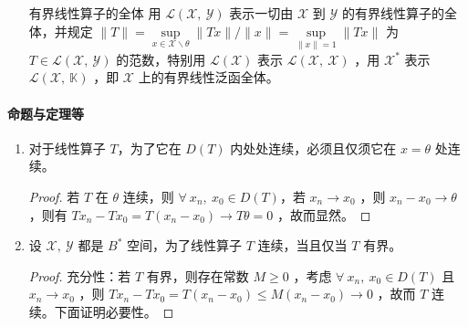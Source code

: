 \begin{enumerate}[leftmargin=2cm, label=\arabic*]
		\item[有界线性算子的全体]用 $\mathscr{L}(\mathscr{X},\ \mathscr{Y})$ 表示一切由 $\mathscr{X}$ 到 $\mathscr{Y}$ 的有界线性算子的全体，并规定 $\|T\| = \sup\limits_{x\in\mathscr{X}\backslash\theta} \|Tx\| / \|x\| = \sup\limits_{\|x\| = 1} \|Tx\|$ 为 $T\in \mathscr{L}(\mathscr{X},\ \mathscr{Y})$ 的范数，特别用 $\mathscr{L}(\mathscr{X})$ 表示 $\mathscr{L}(\mathscr{X},\ \mathscr{X})$ ，用 $\mathscr{X}^*$ 表示 $\mathscr{L}(\mathscr{X},\ \mathbb{K})$ ，即 $\mathscr{X}$ 上的有界线性泛函全体。
	\end{enumerate}
	
	\paragraph{命题与定理等}
	\begin{enumerate}[leftmargin=2cm, label=\arabic*]
		\item 对于线性算子 $T$，为了它在 $D(T)$ 内处处连续，必须且仅须它在 $x = \theta$ 处连续。
		\begin{proof}
			若 $T$ 在 $\theta$ 连续，则 $\forall\ x_n,\ x_0\in D(T)$，若 $x_n\to x_0$ ，则 $x_n - x_0 \to \theta$ ，则有 $Tx_n - Tx_0 = T(x_n - x_0) \to T\theta = 0$ ，故而显然。
		\end{proof}
		\item 设 $\mathscr{X},\ \mathscr{Y}$ 都是 $B^*$ 空间，为了线性算子 $T$ 连续，当且仅当 $T$ 有界。
		\begin{proof}
			充分性：若 $T$ 有界，则存在常数 $M\geqslant 0$ ，考虑 $\forall\ x_n,\ x_0\in D(T)$ 且 $x_n\to x_0$ ，则 $Tx_n - Tx_0 = T(x_n - x_0) \leqslant M (x_n - x_0) \to 0$ ，故而 $T$ 连续。下面证明必要性。
			

\end{proof}
\end{enumerate}
